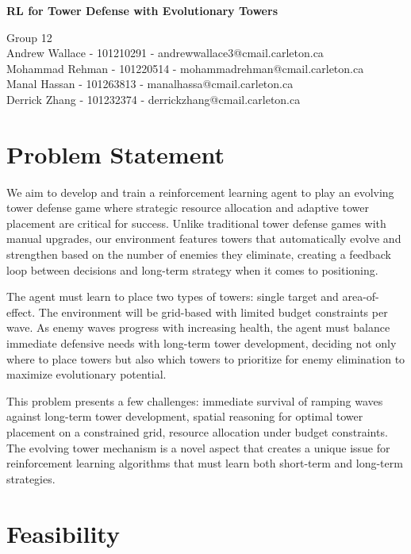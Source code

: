 \documentclass[12pt]{article}
\begin{document}
 

\begin{center} \Large\bf
RL for Tower Defense with Evolutionary Towers\\
\end{center} 

\begin{center}
Group 12 \\
Andrew Wallace - 101210291 - andrewwallace3@cmail.carleton.ca\\
Mohammad Rehman - 101220514 - mohammadrehman@cmail.carleton.ca \\
Manal Hassan - 101263813 - manalhassa@cmail.carleton.ca\\
Derrick Zhang - 101232374 - derrickzhang@cmail.carleton.ca
\end{center}

\section*{Problem Statement}
We aim to develop and train a reinforcement learning agent to play an evolving tower defense game where strategic resource allocation and adaptive tower placement are critical for success. Unlike traditional tower defense games with manual upgrades, our environment features towers that automatically evolve and strengthen based on the number of enemies they eliminate, creating a feedback loop between decisions and long-term strategy when it comes to positioning.\par

The agent must learn to place two types of towers: single target and area-of-effect. The environment will be grid-based with limited budget constraints per wave. As enemy waves progress with increasing health, the agent must balance immediate defensive needs with long-term tower development, deciding not only where to place towers but also which towers to prioritize for enemy elimination to maximize evolutionary potential.\par

This problem presents a few challenges: immediate survival of ramping waves against long-term tower development, spatial reasoning for optimal tower placement on a constrained grid, resource allocation under budget constraints.
The evolving tower mechanism is a novel aspect that creates a unique issue for reinforcement learning algorithms that must learn both short-term and long-term strategies. \par


\section*{Feasibility}
\end{document}
